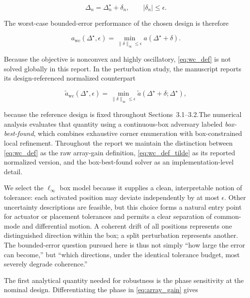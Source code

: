 \begin{equation}
\Delta_n = \Delta_n^\star + \delta_n,
\qquad
|\delta_n| \le \epsilon.
\label{eq:error_model}
\end{equation}

The worst-case bounded-error performance of the chosen design is therefore

\begin{equation}
a_{\mathrm{wc}}(\Delta^\star,\epsilon)
= \min_{\lVert \delta \rVert_\infty \le \epsilon} a(\Delta^\star + \delta).
\label{eq:wc_def}
\end{equation}

Because the objective is nonconvex and highly oscillatory, \eqref{eq:wc_def} is not solved globally in this report. In the perturbation study, the manuscript reports its design-referenced normalized counterpart

\begin{equation}
\tilde{a}_{\mathrm{wc}}(\Delta^\star,\epsilon)
= \min_{\lVert \delta \rVert_\infty \le \epsilon} \tilde{a}(\Delta^\star + \delta;\Delta^\star),
\label{eq:wc_def_tilde}
\end{equation}

because the reference design is fixed throughout Sections~3.1--3.2.The numerical analysis evaluates that quantity using a continuous-box adversary labeled \emph{box-best-found}, which combines exhaustive corner enumeration with box-constrained local refinement. Throughout the report we maintain the distinction between \eqref{eq:wc_def} as the raw array-gain definition, \eqref{eq:wc_def_tilde} as its reported normalized version, and the box-best-found solver as an implementation-level detail.

We select the $\ell_\infty$ box model because it supplies a clean, interpretable notion of tolerance: each activated position may deviate independently by at most $\epsilon$. Other uncertainty descriptions are feasible, but this choice forms a natural entry point for actuator or placement tolerances and permits a clear separation of common-mode and differential motion. A coherent drift of all positions represents one distinguished direction within the box; a split perturbation represents another. The bounded-error question pursued here is thus not simply “how large the error can become,'' but “which directions, under the identical tolerance budget, most severely degrade coherence.''

The first analytical quantity needed for robustness is the phase sensitivity at the nominal design. Differentiating the phase in \eqref{eq:array_gain} gives


